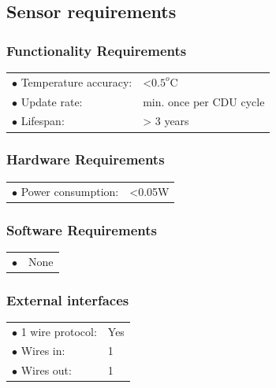 \subsection{Sensor requirements}

\subsubsection{Functionality Requirements}
\begin{table}[H]
\begin{tabular}{p{8cm} p{5cm}}
$\bullet$ Temperature accuracy: & <$0.5^o$C\\
$\bullet$ Update rate: & min. once per CDU cycle\\
$\bullet$ Lifespan: & > 3 years\\
\end{tabular}
\end{table}

\subsubsection{Hardware Requirements}
\begin{table}[H]
\begin{tabular}{p{8cm} p{2cm}}
$\bullet$ Power consumption: & <0.05W\\


\end{tabular}
\end{table}


\subsubsection{Software Requirements}
\begin{table}[H]
\begin{tabular}{p{8cm} p{2cm}}
$\bullet$ & None\\


\end{tabular}
\end{table}


\subsubsection{External interfaces}
\begin{table}[H]
\begin{tabular}{p{8cm} p{2cm}}
$\bullet$ 1 wire protocol: & Yes\\
$\bullet$ Wires in: & 1\\
$\bullet$ Wires out: & 1\\
\end{tabular}
\end{table}

